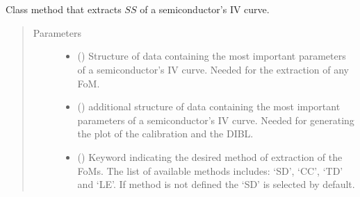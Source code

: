 \documentclass[letterpaper,10pt,english,openany, oneside]{sphinxmanual}
\begin{document}
\begin{fulllineitems}
\label{\detokenize{index:fompy.fom.dibl_ext}}~

\begin{fulllineitems}
\label{\detokenize{index:fompy.fom.dibl_ext.extraction}}~

\begin{fulllineitems}
Class method that extracts \(SS\) of a semiconductor’s IV curve.

\end{fulllineitems}

\begin{quote}\begin{description}
\item[{Parameters}] \leavevmode\begin{itemize}
\item {} 
 () \textendash{} Structure of data containing the most important parameters of a semiconductor’s IV curve.
Needed for the extraction of any FoM.

\item {} 
 () \textendash{} additional structure of data containing the most important parameters of a semiconductor’s IV curve.
Needed for generating the plot of the calibration and the DIBL.

\item {} 
 () \textendash{} Keyword indicating the desired method of extraction of the FoMs. The list of available methods includes:
‘SD’, ‘CC’, ‘TD’ and ‘LE’. If method is not defined the ‘SD’ is selected by default.

\end{itemize}

\end{description}\end{quote}


\end{fulllineitems}
\end{fulllineitems}
\end{document}
